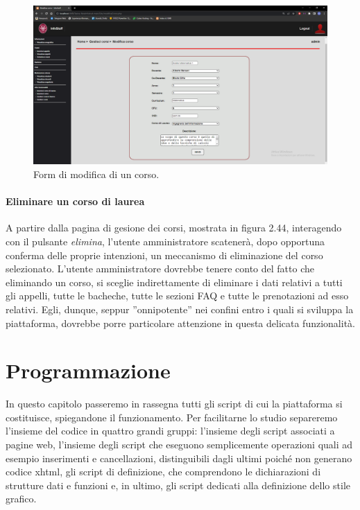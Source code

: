\documentclass [a4paper,11pt]{book}
\begin{document}
\begin{figure}
\centering
\includegraphics[scale=0.3]{figura2-45.png}
\caption{Form di modifica di un corso.}
\end{figure}

\medskip

\subsubsection{Eliminare un corso di laurea}

A partire dalla pagina di gesione dei corsi, mostrata in figura 2.44, interagendo con il pulsante \emph{elimina}, l'utente amministratore scatenerà, dopo opportuna conferma delle proprie intenzioni, un meccanismo di eliminazione del corso selezionato. L'utente amministratore dovrebbe tenere conto del fatto che eliminando un corso, si sceglie indirettamente di eliminare i dati relativi a tutti gli appelli, tutte le bacheche, tutte le sezioni FAQ e tutte le prenotazioni ad esso relativi. Egli, dunque, seppur ''onnipotente'' nei confini entro i quali si sviluppa la piattaforma, dovrebbe porre particolare attenzione in questa delicata funzionalità.

\medskip
\medskip

\chapter{Programmazione}

In questo capitolo passeremo in rassegna tutti gli script di cui la piattaforma si costituisce, spiegandone il funzionamento. Per facilitarne lo studio separeremo l'insieme del codice in quattro grandi gruppi: l'insieme degli script associati a pagine web, l'insieme degli script che eseguono semplicemente operazioni quali ad esempio inserimenti e cancellazioni, distinguibili dagli ultimi poiché non generano codice xhtml, gli script di definizione, che comprendono le dichiarazioni di strutture dati e funzioni e, in ultimo, gli script dedicati alla definizione dello stile grafico.
\end{document}
